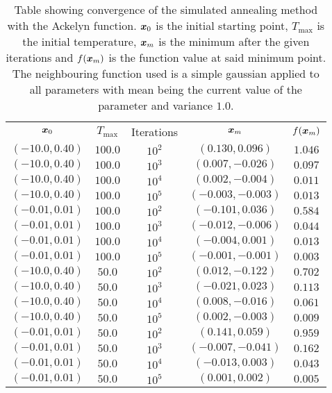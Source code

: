         \begin{table}[H]
            \centering
            \setlength{\tabcolsep}{23.6pt}
            \caption{Table showing convergence of the simulated annealing
            method with the Ackelyn function. $\boldsymbol{{x}}_0$ is the initial
            starting point, $T_{\text{max}}$ is the initial temperature,
            $\boldsymbol{{x}}_m$ is the minimum after the given iterations and
            $f(\boldsymbol{{x}}_m)$ is the function value at said minimum point. The
            neighbouring function used is a simple gaussian applied to all
            parameters with mean being the current value of the parameter and
            variance $1.0$.}
            \label{tab:ackelynconv}
            \begin{tabular}{ccccc} \hline\hline
                $\boldsymbol{{x}}_0$ & $T_{\text{max}}$ & Iterations & $\boldsymbol{{x}}_m$ & $f(\boldsymbol{{x}}_m)$ \\
                $(-10.0,0.40)$ & $100.0$ & $10^2$ & $(0.130,0.096)$ & $1.046$ \\
                $(-10.0,0.40)$ & $100.0$ & $10^3$ & $(0.007,-0.026)$ & $0.097$ \\
                $(-10.0,0.40)$ & $100.0$ & $10^4$ & $(0.002,-0.004)$ & $0.011$ \\
                $(-10.0,0.40)$ & $100.0$ & $10^5$ & $(-0.003,-0.003)$ & $0.013$ \\
                $(-0.01,0.01)$ & $100.0$ & $10^2$ & $(-0.101,0.036)$ & $0.584$ \\
                $(-0.01,0.01)$ & $100.0$ & $10^3$ & $(-0.012,-0.006)$ & $0.044$ \\
                $(-0.01,0.01)$ & $100.0$ & $10^4$ & $(-0.004,0.001)$ & $0.013$ \\
                $(-0.01,0.01)$ & $100.0$ & $10^5$ & $(-0.001,-0.001)$ & $0.003$ \\
                $(-10.0,0.40)$ & $50.0$ & $10^2$ & $(0.012,-0.122)$ & $0.702$ \\
                $(-10.0,0.40)$ & $50.0$ & $10^3$ & $(-0.021,0.023)$ & $0.113$ \\
                $(-10.0,0.40)$ & $50.0$ & $10^4$ & $(0.008,-0.016)$ & $0.061$ \\
                $(-10.0,0.40)$ & $50.0$ & $10^5$ & $(0.002,-0.003)$ & $0.009$ \\
                $(-0.01,0.01)$ & $50.0$ & $10^2$ & $(0.141,0.059)$ & $0.959$ \\
                $(-0.01,0.01)$ & $50.0$ & $10^3$ & $(-0.007,-0.041)$ & $0.162$ \\
                $(-0.01,0.01)$ & $50.0$ & $10^4$ & $(-0.013,0.003)$ & $0.043$ \\
                $(-0.01,0.01)$ & $50.0$ & $10^5$ & $(0.001,0.002)$ & $0.005$ \\ \hline\hline
            \end{tabular}
        \end{table}
